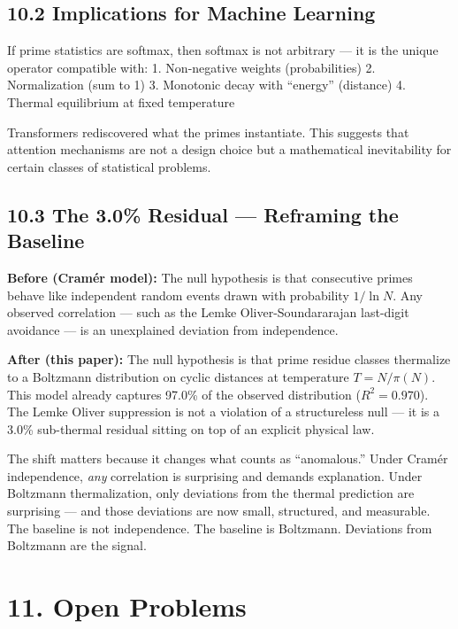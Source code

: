 \documentclass[
  11pt,
]{article}
\numberwithin{equation}{section}
\begin{document}
\subsection{10.2 Implications for Machine
Learning}\label{implications-for-machine-learning}

If prime statistics are softmax, then softmax is not arbitrary --- it is
the unique operator compatible with: 1. Non-negative weights
(probabilities) 2. Normalization (sum to 1) 3. Monotonic decay with
``energy'' (distance) 4. Thermal equilibrium at fixed temperature

Transformers rediscovered what the primes instantiate. This suggests
that attention mechanisms are not a design choice but a mathematical
inevitability for certain classes of statistical problems.

\subsection{10.3 The 3.0\% Residual --- Reframing the
Baseline}\label{the-3.0-residual-reframing-the-baseline}

\textbf{Before (Cramér model):} The null hypothesis is that consecutive
primes behave like independent random events drawn with probability
\(1/\ln N\). Any observed correlation --- such as the Lemke
Oliver-Soundararajan last-digit avoidance --- is an unexplained
deviation from independence.

\textbf{After (this paper):} The null hypothesis is that prime residue
classes thermalize to a Boltzmann distribution on cyclic distances at
temperature \(T = N/\pi(N)\). This model already captures 97.0\% of the
observed distribution (\(R^2 = 0.970\)). The Lemke Oliver suppression is
not a violation of a structureless null --- it is a 3.0\% sub-thermal
residual sitting on top of an explicit physical law.

The shift matters because it changes what counts as ``anomalous.'' Under
Cramér independence, \emph{any} correlation is surprising and demands
explanation. Under Boltzmann thermalization, only deviations from the
thermal prediction are surprising --- and those deviations are now
small, structured, and measurable. The baseline is not independence. The
baseline is Boltzmann. Deviations from Boltzmann are the signal.



\setcounter{section}{11}\setcounter{equation}{0}
\setcounter{section}{11}\setcounter{equation}{0}
\section{11. Open Problems}\label{open-problems}
\end{document}
